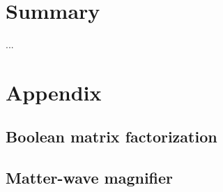 \documentclass[twoside]{article}
\begin{document}
\newpage
\section{Summary} \label{sec:summary}
...


\newpage
\section{Appendix} \label{sec:appendix}

\subsection{Boolean matrix factorization}


\subsection{Matter-wave magnifier} \label{sec:mwm}

%  



% 


\newpage


\end{document}
